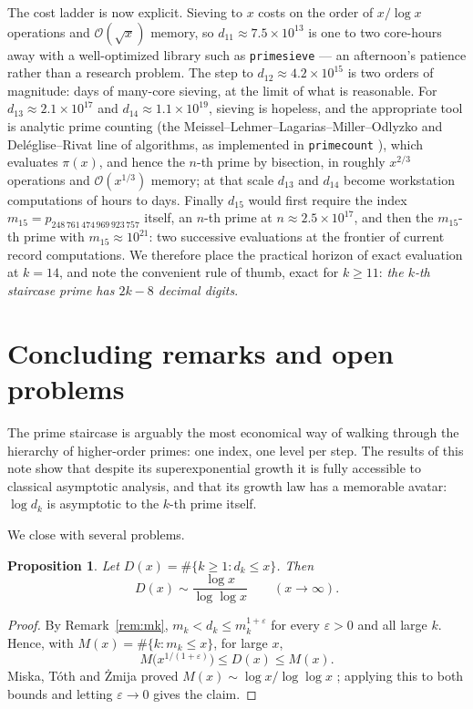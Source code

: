 \documentclass[11pt,a4paper]{article}
\theoremstyle{plain}
\newtheorem{proposition}[theorem]{Proposition}
\theoremstyle{definition}
\begin{document}
The cost ladder is now explicit. Sieving to $x$ costs on the order of
$x/\log x$ operations and $\mathcal{O}(\sqrt{x})$ memory, so
$d_{11}\approx7.5\times10^{13}$ is one to two core-hours away with a
well-optimized library such as \texttt{primesieve} --- an afternoon's
patience rather than a research problem. The step to
$d_{12}\approx4.2\times10^{15}$ is two orders of magnitude: days of
many-core sieving, at the limit of what is reasonable. For
$d_{13}\approx2.1\times10^{17}$ and $d_{14}\approx1.1\times10^{19}$,
sieving is hopeless, and the appropriate tool is analytic prime counting
(the Meissel--Lehmer--Lagarias--Miller--Odlyzko and
Del\'eglise--Rivat line of algorithms, as implemented in
\texttt{primecount} \cite{primesieve}), which evaluates $\pi(x)$, and hence
the $n$-th prime by bisection, in roughly $x^{2/3}$ operations and
$\mathcal{O}(x^{1/3})$ memory; at that scale $d_{13}$ and $d_{14}$ become
workstation computations of hours to days. Finally $d_{15}$ would first
require the index $m_{15}=p_{248\,761\,474\,969\,923\,757}$ itself, an
$n$-th prime at $n\approx2.5\times10^{17}$, and then the
$m_{15}$-th prime with $m_{15}\approx10^{21}$: two successive evaluations
at the frontier of current record computations. We therefore place the
practical horizon of exact evaluation at $k=14$, and note the convenient
rule of thumb, exact for $k\ge11$: \emph{the $k$-th staircase prime has
$2k-8$ decimal digits}.

\section{Concluding remarks and open problems}\label{sec:conclusions}

The prime staircase is arguably the most economical way of walking through
the hierarchy of higher-order primes: one index, one level per step. The
results of this note show that despite its superexponential growth it is
fully accessible to classical asymptotic analysis, and that its growth law
has a memorable avatar: $\log d_k$ is asymptotic to the $k$-th prime
itself.

We close with several problems.

\begin{proposition}\label{prop:counting}
Let $D(x)=\#\{k\ge1: d_k\le x\}$. Then
\[
  D(x)\sim\frac{\log x}{\log\log x}\qquad(x\to\infty).
\]
\end{proposition}

\begin{proof}
By Remark~\ref{rem:mk}, $m_k<d_k\le m_k^{1+\varepsilon}$ for every
$\varepsilon>0$ and all large $k$. Hence, with
$M(x)=\#\{k: m_k\le x\}$, for large $x$,
\[
  M\bigl(x^{1/(1+\varepsilon)}\bigr)\le D(x)\le M(x).
\]
Miska, T\'oth and \.Zmija proved $M(x)\sim\log x/\log\log x$
\cite[Theorem~12]{MiskaTothZmija}; applying this to both bounds and letting
$\varepsilon\to0$ gives the claim.
\end{proof}
\end{document}
